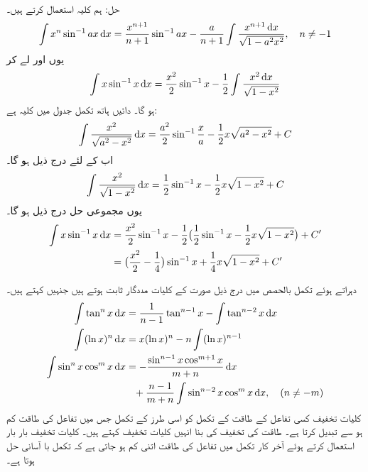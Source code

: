 حل:\quad
ہم کلیہ  استعمال کرتے ہیں۔
\begin{align*}
\int x^n\sin^{-1}ax\dif x=\frac{x^{n+1}}{n+1}\sin^{-1}ax-\frac{a}{n+1}\int\frac{x^{n+1}\dif x}{\sqrt{1-a^2x^2}},\quad n\ne -1
\end{align*}
یوں  اور  لے کر
\begin{align*}
\int x\sin^{-1}x\dif x=\frac{x^2}{2}\sin^{-1}x-\frac{1}{2}\int\frac{x^2\dif x}{\sqrt{1-x^2}}
\end{align*}
ہو گا۔ دائیں ہاتھ تکمل جدول میں کلیہ  ہے:
\begin{align*}
\int \frac{x^2}{\sqrt{a^2-x^2}}\dif x=\frac{a^2}{2}\sin^{-1}\frac{x}{a}-\frac{1}{2}x\sqrt{a^2-x^2}+C
\end{align*}
اب  کے لئے درج ذیل ہو گا۔
\begin{align*}
\int \frac{x^2}{\sqrt{1-x^2}}\dif x=\frac{1}{2}\sin^{-1}x-\frac{1}{2}x\sqrt{1-x^2}+C
\end{align*}
یوں مجموعی حل درج ذیل ہو گا۔
\begin{align*}
\int x\sin^{-1}x\dif x&=\frac{x^2}{2}\sin^{-1}x-\frac{1}{2}\big(\frac{1}{2}\sin^{-1}x-\frac{1}{2}x\sqrt{1-x^2}\big)+C'\\
&=\big(\frac{x^2}{2}-\frac{1}{4}\big)\sin^{-1}x+\frac{1}{4}x\sqrt{1-x^2}+C'
\end{align*}

دہراتے ہوئے تکمل بالحصص میں درج ذیل صورت کے کلیات مددگار ثابت ہوتے ہیں جنہیں  کہتے ہیں۔
\begin{align}
\int \tan^n x\dif x&=\frac{1}{n-1}\tan^{n-1}x-\int \tan^{n-2}x\dif x\label{مساوات_طریقہ_کلیات_تخفیف_الف}\\
\int(\ln x)^n\dif x&=x(\ln x)^n-n\int(\ln x)^{n-1}\label{مساوات_طریقہ_کلیات_تخفیف_ب}\\
\int\sin^nx\cos^mx\dif x&=-\frac{\sin^{n-1}x\cos^{m+1}x}{m+n}\dif x\nonumber\\
&\phantom{=}+\frac{n-1}{m+n}\int\sin^{n-2}x\cos^mx\dif x,\quad (n\ne -m)\label{مساوات_طریقہ_کلیات_تخفیف_پ}
\end{align}
کلیات تخفیف کسی تفاعل کے طاقت کے تکمل کو اسی طرز کے تکمل جس میں تفاعل کی طاقت کم ہو سے تبدیل کرتا ہے۔ طاقت کی تخفیف کی بنا انہیں کلیات تخفیف کہتے ہیں۔ کلیات تخفیف بار بار استعمال کرتے ہوئے آخر کار تکمل میں تفاعل کی طاقت اتنی کم ہو جاتی ہے کہ تکمل با آسانی حل ہوتا ہے۔

